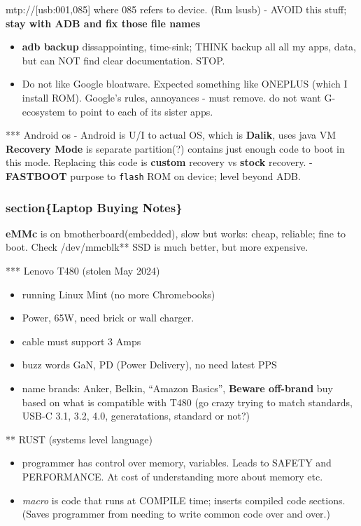 \documentclass[
  letterpaper,
  DIV=11,
  numbers=noendperiod]{scrartcl}
\providecommand{\tightlist}{%
  \setlength{\itemsep}{0pt}\setlength{\parskip}{0pt}}\usepackage{longtable,booktabs,array}
\begin{document}
mtp://{[}usb:001,085{]} where 085 refers to device. (Run lsusb) - AVOID
this stuff; \textbf{stay with ADB and fix those file names}

\begin{itemize}
\tightlist
\item
  \textbf{adb backup} dissappointing, time-sink; THINK backup all all my
  apps, data, but can NOT find clear documentation. STOP.
\item
  Do not like Google bloatware. Expected something like ONEPLUS (which I
  install ROM). Google's rules, annoyances - must remove. do not want G-
  ecosystem to point to each of its sister apps.
\end{itemize}

*** Android os - Android is U/I to actual OS, which is \textbf{Dalik},
uses java VM \textbf{Recovery Mode} is separate partition(?) contains
just enough code to boot in this mode. Replacing this code is
\textbf{custom} recovery vs \textbf{stock} recovery. - \textbf{FASTBOOT}
purpose to \texttt{flash} ROM on device; level beyond ADB.

\subsubsection{section\{Laptop Buying
Notes\}}\label{sectionlaptop-buying-notes}

\textbf{eMMc} is on bmotherboard(embedded), slow but works: cheap,
reliable; fine to boot. Check /dev/mmcblk** SSD is much better, but more
expensive.

*** Lenovo T480 (stolen May 2024)

\begin{itemize}
\tightlist
\item
  running Linux Mint (no more Chromebooks)
\item
  Power, 65W, need brick or wall charger.
\item
  cable must support 3 Amps
\item
  buzz words GaN, PD (Power Delivery), no need latest PPS
\item
  name brands: Anker, Belkin, ``Amazon Basics'', \textbf{Beware
  off-brand} buy based on what is compatible with T480 (go crazy trying
  to match standards, USB-C 3.1, 3.2, 4.0, generatations, standard or
  not?)
\end{itemize}

** RUST (systems level language)

\begin{itemize}
\item
  programmer has control over memory, variables. Leads to SAFETY and
  PERFORMANCE. At cost of understanding more about memory etc.
\item
  \emph{macro} is code that runs at COMPILE time; inserts compiled code
  sections. (Saves programmer from needing to write common code over and
  over.)
\end{itemize}
\end{document}
